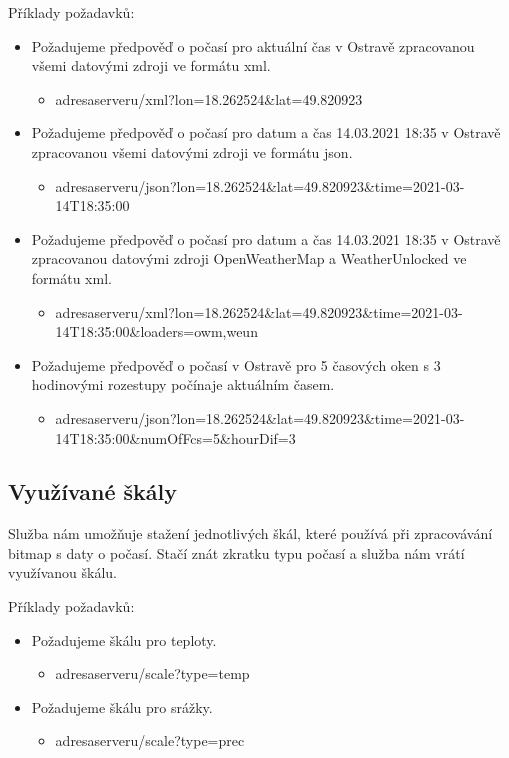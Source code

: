 \documentclass[czech,bachelor,dept460,male,csharp,cpdeclaration]{diploma}
\begin{document}
	Příklady požadavků:
	\begin{itemize}
		\item Požadujeme předpověď o počasí pro aktuální čas v Ostravě zpracovanou všemi datovými zdroji ve formátu xml.
		\begin{itemize}
			\item adresaserveru/xml?lon=18.262524\&lat=49.820923
	   \end{itemize}	
		\item Požadujeme předpověď o počasí pro datum a čas 14.03.2021 18:35 v Ostravě zpracovanou všemi datovými zdroji ve formátu json.
		\begin{itemize}
			\item adresaserveru/json?lon=18.262524\&lat=49.820923\&time=2021-03-14T18:35:00
		\end{itemize}
		\item Požadujeme předpověď o počasí pro datum a čas 14.03.2021 18:35 v Ostravě zpracovanou datovými zdroji OpenWeatherMap a WeatherUnlocked ve formátu xml.
		\begin{itemize}
			\item adresaserveru/xml?lon=18.262524\&lat=49.820923\&time=2021-03-14T18:35:00\&loaders=owm,weun
		\end{itemize}
		\item Požadujeme předpověď o počasí v Ostravě pro 5 časových oken s 3 hodinovými rozestupy počínaje aktuálním časem.
		\begin{itemize}
			\item adresaserveru/json?lon=18.262524\&lat=49.820923\&time=2021-03-14T18:35:00\&numOfFcs=5\&hourDif=3
		\end{itemize}
	\end{itemize}
	
	\subsection{Využívané škály}
	
	Služba nám umožňuje stažení jednotlivých škál, které používá při zpracovávání bitmap s daty o počasí. Stačí znát zkratku typu počasí a služba nám vrátí využívanou škálu.
	
	Příklady požadavků:
	\begin{itemize}
		\item Požadujeme škálu pro teploty.
		\begin{itemize}
			\item adresaserveru/scale?type=temp
		\end{itemize}
		\item Požadujeme škálu pro srážky.
		\begin{itemize}
			\item adresaserveru/scale?type=prec
		\end{itemize}
	\end{itemize}
	
\end{document}
